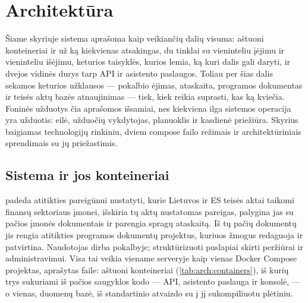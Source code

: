 \chapter{Architektūra}\label{ch:arch}

Šiame skyriuje sistema aprašoma kaip veikiančių dalių visuma: aštuoni konteineriai ir už ką
kiekvienas atsakingas, du tinklai su vieninteliu įėjimu ir vieninteliu išėjimu, keturios
taisyklės, kurios lemia, ką kuri dalis gali daryti, ir dvejos vidinės durys tarp API ir
asistento paslaugos. Toliau per šias dalis sekamos keturios užklausos --- pokalbio ėjimas,
ataskaita, programos dokumentas ir teisės aktų bazės atnaujinimas --- tiek, kiek reikia
suprasti, kas ką kviečia. Foninės užduotys čia aprašomos išsamiai, nes kiekviena ilga
sistemos operacija yra užduotis: eilė, užduočių vykdytojas, planuoklis ir kasdienė priežiūra.
Skyrius baigiamas technologijų rinkiniu, dviem compose failo režimais ir
architektūriniais sprendimais su jų priežastimis.

\section{Sistema ir jos konteineriai}\label{sec:arch:containers}

\product{} padeda atitikties pareigūnui nustatyti, kurie Lietuvos ir ES teisės aktai taikomi
finansų sektoriaus įmonei, išskiria tų aktų nustatomas pareigas, palygina jas su pačios
įmonės dokumentais ir parengia spragų ataskaitą. Iš tų pačių dokumentų jis rengia atitikties
programos dokumentų projektus, kuriuos žmogus redaguoja ir patvirtina. Naudotojas dirba
pokalbyje; struktūrizuoti puslapiai skirti peržiūrai ir administravimui. Visa tai veikia
viename serveryje kaip vienas Docker Compose projektas, aprašytas 
faile: aštuoni konteineriai (\cref{tab:arch:containers}), iš kurių trys sukuriami iš pačios
saugyklos kodo --- API, asistento paslauga ir konsolė, --- o vienas, duomenų bazė, iš
standartinio atvaizdo su į jį sukompiliuotu plėtiniu.

